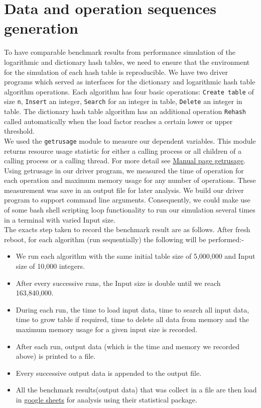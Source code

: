 \documentclass[a4paper,12pt, openany]{book}
\begin{document}
\section{Data and operation sequences generation}
To have comparable benchmark results from performance simulation of the logarithmic and dictionary hash tables, we need to ensure that the environment for the simulation of each hash table is reproducible.
 We have two driver programs which served as interfaces for the dictionary and logarithmic hash table algorithm operations. Each algorithm has four basic operations: \texttt{Create table} of size \texttt{n}, \texttt{Insert} an integer, \texttt{Search} for an integer in table, \texttt{Delete} an integer in table. The dictionary hash table algorithm has an additional operation \texttt{Rehash} called automatically when the load factor reaches a certain lower or upper threshold.\\
We used the \texttt{getrusage} module to measure our dependent variables. This module returns resource usage statistic for either a calling process or all children of a calling process or a calling thread. For more detail see \href{http://man7.org/linux/man-pages/man2/getrusage.2.html}{Manual page getrusage}.   
Using getrusage in our driver program, we measured the time of operation for each operation and maximum memory usage for any number of operations. These measurement was save in an output file for later analysis. We build our driver program to support command line arguments. Consequently, we could make use of some bash shell scripting loop functionality to run our simulation several times in a terminal with varied Input size.\\

The exacts step taken to record the benchmark result are as follows.  
After fresh reboot, for each algorithm (run sequentially) the following will be performed:-
\begin{itemize}
	\item We run each algorithm with the same initial table size of 5,000,000 and Input size of 10,000 integers.
	\item After every successive runs, the Input size is double until we reach 163,840,000.
	\item During each run, the time to load input data, time to search all input data, time to grow table if required, time to delete all data from memory and the maximum memory usage for a given input size is recorded.
	\item After each run, output data (which is the time and memory we recorded above) is printed to  a file.
	\item Every successive output data is appended to the output file.
	\item All the benchmark results(output data) that was collect in a file are then load in \href{https://www.google.com/sheets/about/}{google sheets} for analysis using their statistical package.
\end{itemize}
\end{document}

